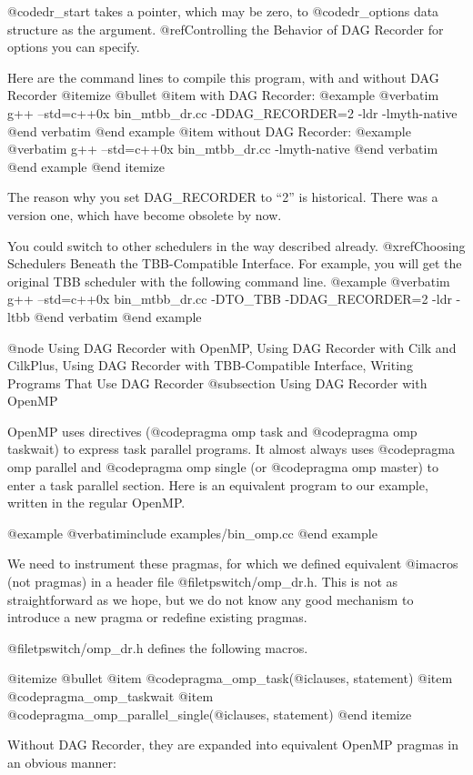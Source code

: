 @code{dr_start} takes a pointer, which may be zero, to @code{dr_options} data structure as the argument.  
@ref{Controlling the Behavior of DAG Recorder} for options you can specify.

Here are the command lines to compile this program, with and without DAG Recorder
@itemize @bullet
@item with DAG Recorder:
@example
@verbatim
g++ --std=c++0x bin_mtbb_dr.cc -DDAG_RECORDER=2 -ldr -lmyth-native 
@end verbatim
@end example
@item without DAG Recorder:
@example
@verbatim
g++ --std=c++0x bin_mtbb_dr.cc -lmyth-native
@end verbatim
@end example
@end itemize

The reason why you set DAG_RECORDER to ``2'' is historical.  There was a version one, which have become obsolete by now.

You could switch to other schedulers in the way described already. @xref{Choosing Schedulers Beneath the TBB-Compatible Interface}.  For example, you will get the original TBB scheduler with the following command line.
@example
@verbatim
g++ --std=c++0x bin_mtbb_dr.cc -DTO_TBB -DDAG_RECORDER=2 -ldr -ltbb 
@end verbatim
@end example

@node Using DAG Recorder with OpenMP, Using DAG Recorder with Cilk and CilkPlus, Using DAG Recorder with TBB-Compatible Interface, Writing Programs That Use DAG Recorder
@subsection Using DAG Recorder with OpenMP

OpenMP uses directives (@code{pragma omp task} and @code{pragma omp
taskwait}) to express task parallel programs.  It almost always uses
@code{pragma omp parallel} and @code{pragma omp single} (or @code{pragma
omp master}) to enter a task parallel section.  Here is an equivalent
program to our example, written in the regular OpenMP.

@example
@verbatiminclude examples/bin_omp.cc
@end example

We need to instrument these pragmas, for which we defined equivalent
@i{macros} (not pragmas) in a header file @file{tpswitch/omp_dr.h}.
This is not as straightforward as we hope, but we do not know any good
mechanism to introduce a new pragma or redefine existing pragmas.

@file{tpswitch/omp_dr.h} defines the following macros.

@itemize @bullet
@item @code{pragma_omp_task(@i{clauses, statement})}
@item @code{pragma_omp_taskwait}
@item @code{pragma_omp_parallel_single(@i{clauses, statement})}
@end itemize

Without DAG Recorder, they are expanded into equivalent OpenMP pragmas
in an obvious manner:

